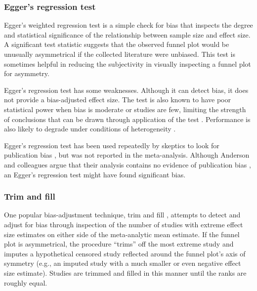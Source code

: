\documentclass[man, mask]{apa6}
\begin{document}
\subsubsection{Egger's regression test}
Egger's weighted regression test \citep{Sterne:Egger:2005} is a simple check for bias that inspects the degree and statistical significance of the relationship between sample size and effect size. A significant test statistic suggests that the observed funnel plot would be unusually asymmetrical if the collected literature were unbiased. This test is sometimes helpful in reducing the subjectivity in visually inspecting a funnel plot for asymmetry. 

Egger's regression test has some weaknesses. Although it can detect bias, it does not provide a bias-adjusted effect size. The test is also known to have poor statistical power when bias is moderate or studies are few, limiting the strength of conclusions that can be drawn through application of the test \citep{Sterne:etal:2000}. Performance is also likely to degrade under conditions of heterogeneity \citep[e.g.,][]{Lau:etal:2006,Terrin:etal:2003}. 

Egger's regression test has been used repeatedly by skeptics to look for publication bias \citep[e.g.,][]{Ferguson:2007,Ferguson:Kilburn:2009}, but was not reported in the \citet{Anderson:etal:2010} meta-analysis. Although Anderson and colleagues argue that their analysis contains no evidence of publication bias \citep{Bushman:etal:2010}, an Egger's regression test might have found significant bias.

\subsubsection{Trim and fill}
One popular bias-adjustment technique, trim and fill \citep{Duval:Tweedie:2000}, attempts to detect and adjust for bias through inspection of the number of studies with extreme effect size estimates on either side of the meta-analytic mean estimate. If the funnel plot is asymmetrical, the procedure ``trims'' off the most extreme study and imputes a hypothetical censored study reflected around the funnel plot's axis of symmetry (e.g., an imputed study with a much smaller or even negative effect size estimate). Studies are trimmed and filled in this manner until the ranks are roughly equal. 
\end{document}
